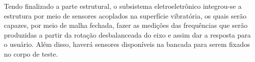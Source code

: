 Tendo finalizado a parte estrutural, o subsistema eletroeletrônico integrou-se a estrutura por meio de sensores acoplados na superfície vibratória, os quais serão capazes, por meio de malha fechada, fazer as medições das frequências que serão produzidas a partir da rotação desbalanceada do eixo e assim dar a resposta para o usuário. Além disso, haverá sensores disponíveis na bancada para serem fixados no corpo de teste.








